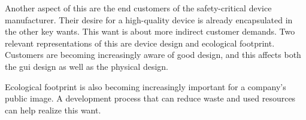 Another aspect of this are the end customers of the safety-critical device manufacturer. Their desire for a high-quality device is already encapsulated in the other key wants. This want is about more indirect customer demands. Two relevant representations of this are device design and ecological footprint. Customers are becoming increasingly aware of good design, and this affects both the \acrfull{gui} design as well as the physical design. 

Ecological footprint is also becoming increasingly important for a company's public image. A development process that can reduce waste and used resources can help realize this want.

\begin{comment}
This want may seem odd at first but employees are the ones that are ultimately responsible for the success and failure of the project.

If we take software tools as an example: The software could be challenging to work with or include many repetitive tasks. Repetitive tasks are shown to decrease efficiency and increase the chance for mistakes \cite{Wyatt.1937}. Additionally, depending on the cause for the dissatisfaction it can also be indicative of problems that could them self introduce errors. For example, a software tool that is overly complicated. In this instance, the employee dissatisfaction is only an indicator for a hidden root cause.

An employee that is unsatisfied with his job, for whatever reason, is also more likely to leave the company. If the person was critical to the project, this can have hugely detrimental effects. Furthermore, if enough key people leave, the entire project can be endangered. 
\end{comment}

\begin{comment}
\section{Future-proof design}
Whenever there is an associated hardware , future-proof design is especially important. Software can be reproduced and shipped with practically no cost but devices can not. Any features that have been forgotten can only be added once the next major hardware revision is released.

Safety-critical devices are particularly notable in this respect since they are often very complex and have an expensive engineering process. Airplanes are typically used for 3 decades, and hospitals have notoriously tight budgets and have to squeeze as much lifetime out of their devices as possible. 
\end{comment}
